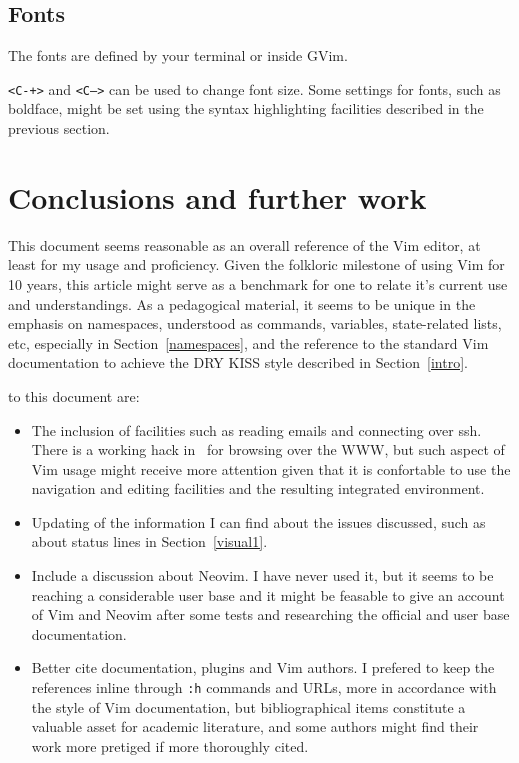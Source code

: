 \documentclass{article}
\newcommand{\ttt}[1] {
	\texttt{<#1>}}
\newcommand{\tttt}[1] {
	\texttt{#1}}
\begin{document}
\subsection{Fonts}
The fonts are defined by your terminal or inside GVim.
\ttt{C-+} and \ttt{C--} can be used to change font size.
Some settings for fonts, such as boldface, might be set using
the syntax highlighting facilities described in the previous section.

\section{Conclusions and further work}\label{conc}
This document seems reasonable as an overall reference of the Vim editor,
at least for my usage and proficiency.
Given the folkloric milestone of using Vim for 10 years,
this article might serve as a benchmark for one to relate
it's current use and understandings.
As a pedagogical material, it seems to be unique in the emphasis
on namespaces, understood as commands, variables, state-related lists, etc,
especially in Section~\ref{namespaces},
and the reference to the standard Vim documentation
to achieve the DRY KISS style described in Section~\ref{intro}.

 to this document are:
\begin{itemize}
  \item The inclusion of facilities such as reading emails and connecting over ssh.
    There is a working hack in~\cite{vimrc} for browsing over the WWW,
    but such aspect of Vim usage might receive more attention
    given that it is confortable to use the navigation and editing facilities
    and the resulting integrated environment.
  \item Updating of the information I can find about the issues discussed,
    such as about status lines in Section~\ref{visual1}.
  \item Include a discussion about Neovim.
    I have never used it, but it seems to be reaching a considerable user base
    and it might be feasable to give an account of Vim and Neovim
    after some tests and researching the official and user base documentation.
  \item Better cite documentation, plugins and Vim authors.
    I prefered to keep the references inline through \tttt{:h} commands
    and URLs, more in accordance with the style of Vim documentation,
    but bibliographical items constitute a valuable asset for academic literature,
    and some authors might find their work more pretiged if more
    thoroughly cited.
\end{itemize}
\end{document}

